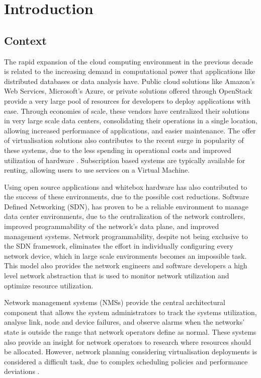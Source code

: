 \chapter{Introduction} \label{chap:introduction} 

\section {Context} \label{context}

The rapid expansion of the cloud computing environment in the previous decade is related to the increasing demand in computational power that applications like 
distributed databases or data analysis have. Public cloud solutions like Amazon's Web Services, Microsoft's Azure, or private solutions offered through OpenStack
provide a very large pool of resources for developers to deploy applications with ease. Through economies of scale, these vendors have
centralized their solutions in very large scale data centers, consolidating their operations in a single location, allowing increased performance of applications, and
easier maintenance. The offer of virtualisation solutions also contributes to the recent surge in popularity of these systems, due to the less spending in
operational costs and improved utilization of hardware \cite{sims_david_carousels_2011}. Subscription based systems are typically available for renting, allowing 
users to use services on a Virtual Machine.

\par Using open source applications and whitebox hardware has also contributed to the success of these environments, due to the possible cost reductions. Software
Defined Networking (SDN), has proven to be a reliable environment to manage data center environments, due to the centralization of the network
controllers, improved programmability of the network's data plane, and improved management systems. Network programmability, despite not being exclusive to the 
SDN framework, eliminates the effort in individually configuring every network device, which in large scale environments becomes an impossible task. This model
also provides the network engineers and software developers a high level network abstraction that is used to monitor network utilization and optimize resource
utilization. 

\par Network management systems (NMSs) provide the central architectural component that allows the system administrators to track the systems utilization, 
analyse link, node and device failures, and observe alarms when the networks' state is outside the range that network operators define as normal. These systems
also provide an insight for network operators to research where resources should be allocated. However, network planning considering virtualisation deployments 
is considered a difficult task, due to complex scheduling policies and performance deviations \cite{sampaio_energy-efficient_2015}. 

